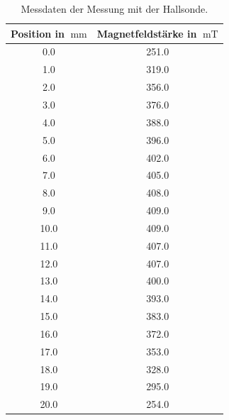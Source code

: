 \begin{table}[h!]
  \centering
  \caption{Messdaten der Messung mit der Hallsonde.}
  \label{tab:magFeld}
  \begin{tabular}{c | c}
    \toprule
    Position in $\SI{}{\milli\meter}$ & Magnetfeldstärke in $\SI{}{\milli\tesla}$ \\
    \midrule
    0.0 & 251.0 \\
    1.0 & 319.0 \\
    2.0 & 356.0 \\
    3.0 & 376.0 \\
    4.0 & 388.0 \\
    5.0 & 396.0 \\
    6.0 & 402.0 \\
    7.0 & 405.0 \\
    8.0 & 408.0 \\
    9.0 & 409.0 \\
    10.0 & 409.0 \\
    11.0 & 407.0 \\
    12.0 & 407.0 \\
    13.0 & 400.0 \\
    14.0 & 393.0 \\
    15.0 & 383.0 \\
    16.0 & 372.0 \\
    17.0 & 353.0 \\
    18.0 & 328.0 \\
    19.0 & 295.0 \\
    20.0 & 254.0 \\
    \bottomrule
  \end{tabular}
\end{table}
\FloatBarrier
\newpage
